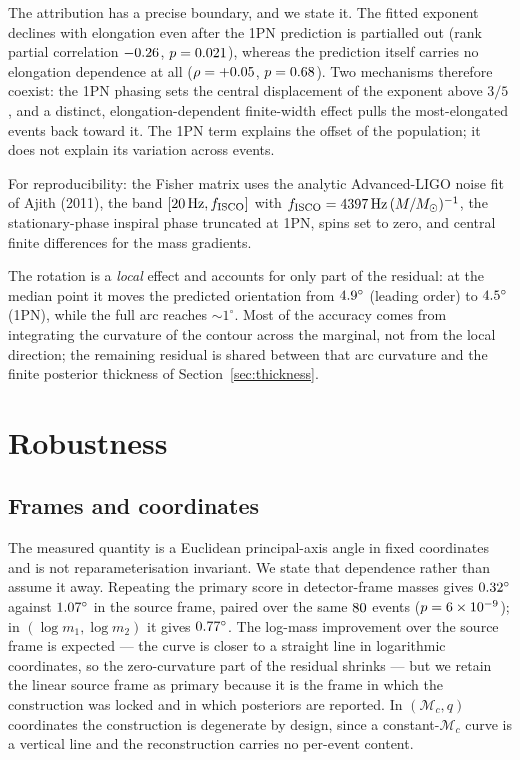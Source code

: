 \documentclass[aps,preprint,amsmath,amssymb,nofootinbib,superscriptaddress]{revtex4-2}
\begin{document}
The attribution has a precise boundary, and we state it. The fitted exponent declines with elongation even
after the 1PN prediction is partialled out (rank partial correlation $-0.26$, $p=0.021$),
whereas the prediction itself carries no elongation dependence at all ($\rho=+0.05$,
$p=0.68$). Two mechanisms therefore coexist: the 1PN phasing sets the central displacement of
the exponent above $3/5$, and a distinct, elongation-dependent finite-width effect pulls the
most-elongated events back toward it. The 1PN term explains the offset of the population; it does not
explain its variation across events.

For reproducibility: the Fisher matrix uses the analytic Advanced-LIGO noise fit of Ajith (2011), the
band $[20\,\mathrm{Hz}, f_{\rm ISCO}]$ with $f_{\rm ISCO}=4397\,\mathrm{Hz}\,(M/M_\odot)^{-1}$, the
stationary-phase inspiral phase truncated at 1PN, spins set to zero, and central finite differences for
the mass gradients.

The rotation is a \emph{local} effect and accounts for only part of the residual: at the median point it
moves the predicted orientation from $4.9^\circ$ (leading order) to $4.5^\circ$ (1PN), while
the full arc reaches $\sim\!1^\circ$. Most of the accuracy comes from integrating the curvature of the
contour across the marginal, not from the local direction; the remaining residual is shared between that
arc curvature and the finite posterior thickness of Section~\ref{sec:thickness}.

\section{Robustness}
\label{sec:robust}

\subsection{Frames and coordinates}
\label{sec:frames}
The measured quantity is a Euclidean principal-axis angle in fixed coordinates and is not
reparameterisation invariant. We state that dependence rather than assume it away. Repeating the primary
score in detector-frame masses gives $0.32^\circ$ against $1.07^\circ$ in the source
frame, paired over the same $80$ events ($p=6\times10^{-9}$); in $(\log m_1, \log m_2)$ it gives
$0.77^\circ$. The log-mass improvement over the source frame is expected --- the curve is closer
to a straight line in logarithmic coordinates, so the zero-curvature part of the residual shrinks --- but
we retain the linear source frame as primary because it is the frame in which the construction was locked
and in which posteriors are reported. In $(\mathcal{M}_c, q)$ coordinates the construction is degenerate by design, since a
constant-$\mathcal{M}_c$ curve is a vertical line and the reconstruction carries no per-event content.
\end{document}
